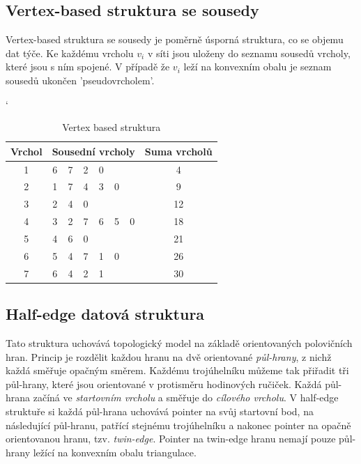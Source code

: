 \documentclass[12pt,a4paper]{article}
\begin{document}
\subsection{Vertex-based struktura se sousedy}

Vertex-based struktura se sousedy je poměrně úsporná struktura, co se objemu dat týče. Ke každému vrcholu $v_i$ v síti jsou uloženy do seznamu sousedů vrcholy, které jsou s ním spojené. V případě že $v_i$ leží na konvexním obalu je seznam sousedů ukončen 'pseudovrcholem'. 

\begin{table}[h]
\catcode`
\begin{tabular}{|c||c|c|c|c|c|c||c|}
\hline
Vrchol & \multicolumn{6}{|c|}{Sousední vrcholy} & Suma vrcholů \\ \hline \hline
1      & 6    & 7    & 2    & 0    &     &     & 4            \\ \hline
2      & 1    & 7    & 4    & 3    & 0   &     & 9            \\ \hline
3      & 2    & 4    & 0    &      &     &     & 12           \\ \hline
4      & 3    & 2    & 7    & 6    & 5   & 0   & 18           \\ \hline
5      & 4    & 6    & 0    &      &     &     & 21           \\ \hline
6      & 5    & 4    & 7    & 1    & 0   &     & 26           \\ \hline
7      & 6    & 4    & 2    & 1    &     &     & 30           \\ \hline
\end{tabular}
\caption{Vertex based struktura}
\label{tab:vertex_based}
\end{table}

\newpage
\subsection{Half-edge datová struktura}

Tato struktura uchovává topologický model na základě orientovaných polovičních hran. Princip je rozdělit každou hranu na dvě orientované \emph{půl-hrany}, z nichž každá směřuje opačným směrem. Každému trojúhelníku můžeme tak přiřadit tři půl-hrany, které jsou orientované v protisměru hodinových ručiček. Každá půl-hrana začíná ve \emph{startovním vrcholu} a směřuje do \emph{cílového vrcholu}. V half-edge struktuře si každá půl-hrana uchovává pointer na svůj startovní bod, na následující půl-hranu, patřící stejnému trojúhelníku a nakonec pointer na opačně orientovanou hranu, tzv. \emph{twin-edge}. Pointer na twin-edge hranu nemají pouze půl-hrany ležící na konvexním obalu triangulace.
\end{document}
